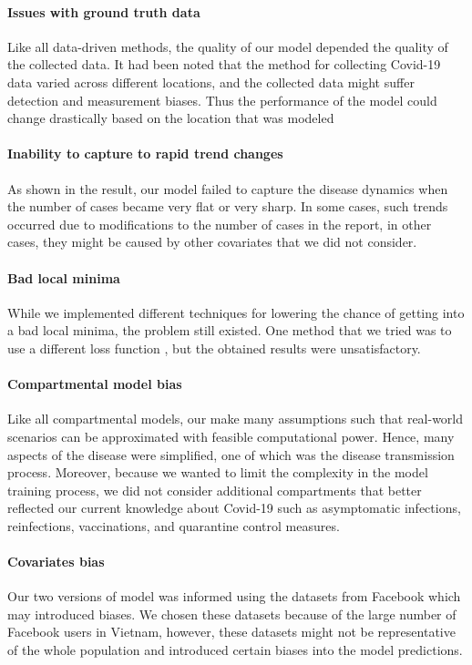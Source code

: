\paragraph{Issues with ground truth data}
Like all data-driven methods, the quality of our model depended the quality of the collected data.
It had been noted that the method for collecting Covid-19 data varied across different locations, and the collected data might suffer detection and measurement biases.
Thus the performance of the model could change drastically based on the location that was modeled

\paragraph{Inability to capture to rapid trend changes}
As shown in the result, our model failed to capture the disease dynamics when the number of cases became very flat or very sharp.
In some cases, such trends occurred due to modifications to the number of cases in the report, in other cases, they might be caused by other covariates that we did not consider.

\paragraph{Bad local minima}
While we implemented different techniques for lowering the chance of getting into a bad local minima, the problem still existed.
One method that we tried was to use a different loss function \cite{vortmeyer-kleyTrajectorybasedLossFunction2021}, but the obtained results were unsatisfactory.

\paragraph{Compartmental model bias}
Like all compartmental models, our make many assumptions such that real-world scenarios can be approximated with feasible computational power.
Hence, many aspects of the disease were simplified, one of which was the disease transmission process.
Moreover, because we wanted to limit the complexity in the model training process, we did not consider additional compartments that better reflected our current knowledge about Covid-19 such as asymptomatic infections, reinfections, vaccinations, and quarantine control measures.

\paragraph{Covariates bias}
Our two versions of model was informed using the datasets from Facebook which may introduced biases.
We chosen these datasets because of the large number of Facebook users in Vietnam, however, these datasets might not be representative of the whole population and introduced certain biases into the model predictions.

